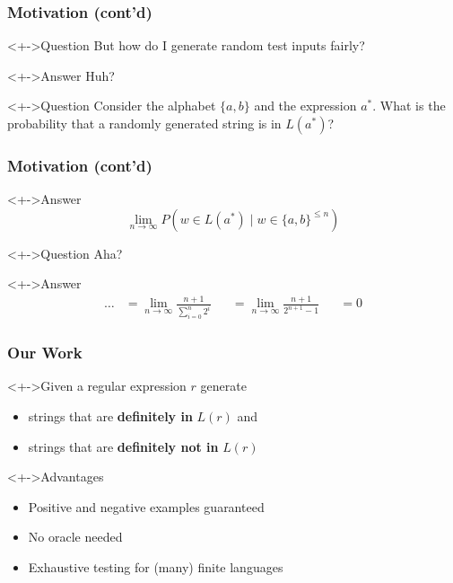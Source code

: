 \documentclass[pdftex]{beamer}
\begin{document}
\begin{frame}
  \frametitle{Motivation (cont'd)}
  \begin{block}<+->{Question}
    But how do I generate random test inputs fairly?
  \end{block}
  \begin{exampleblock}<+->{Answer}
    Huh?
  \end{exampleblock}
  \begin{block}<+->{Question}
    Consider the alphabet $\{a,b\}$ and the expression $a^*$. What is
    the probability that a randomly generated string is in $L (a^*)$?
  \end{block}
\end{frame}
\begin{frame}
  \frametitle{Motivation (cont'd)}
  \begin{exampleblock}<+->{Answer}
    \begin{displaymath}
      \lim_{n\to\infty} P (w \in L(a^*) \mid w \in \{a,b\}^{\le n})
    \end{displaymath}
  \end{exampleblock}
  \begin{block}<+->{Question}
    Aha?
  \end{block}
  \begin{exampleblock}<+->{Answer}
    \vspace{-\baselineskip}
    \begin{align*}
      \dots&= \lim_{n\to\infty} \frac{n+1}{\sum_{i=0}^n 2^i } &
      &= \lim_{n\to\infty} \frac{n+1}{ 2^{n+1} -1 }  &
      &=0
    \end{align*}
  \end{exampleblock}
\end{frame}
\begin{frame}
  \frametitle{Our Work}
  \begin{block}<+->{Given a regular expression $r$ generate}
    \begin{itemize}
    \item strings that are \textbf{definitely in} $L(r)$ and
    \item strings that are \textbf{definitely not in} $L(r)$
    \end{itemize}
  \end{block}
  \begin{block}<+->{Advantages}
    \begin{itemize}
    \item Positive and negative examples guaranteed 
    \item No oracle needed
    \item Exhaustive testing for (many) finite languages
    \end{itemize}
  \end{block}
\end{frame}
\end{document}
